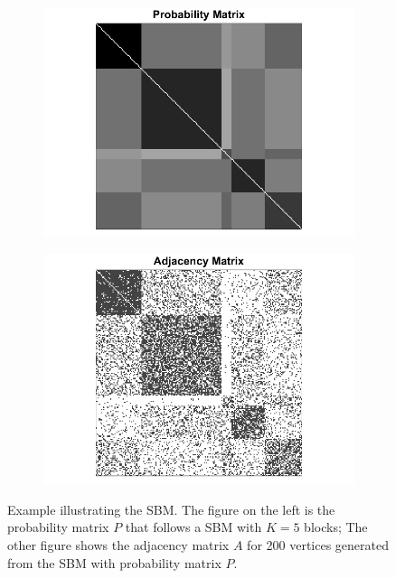 \documentclass[a4paper]{article}
\begin{document}
\begin{figure}
\centering
\begin{subfigure}{.5\textwidth}
  \centering
  \includegraphics[width=1.2\linewidth]{SBM_P.png}
\end{subfigure}%
\begin{subfigure}{.5\textwidth}
  \centering
  \includegraphics[width=1.2\linewidth]{SBM_A.png}
\end{subfigure}
\caption{Example illustrating the SBM. The figure on the left is the probability matrix $P$ that follows a SBM with $K = 5$ blocks; The other figure shows the adjacency matrix $A$ for 200 vertices generated from the SBM with probability matrix $P$.}
\label{fig:SBM_example}
\end{figure}
\end{document}
